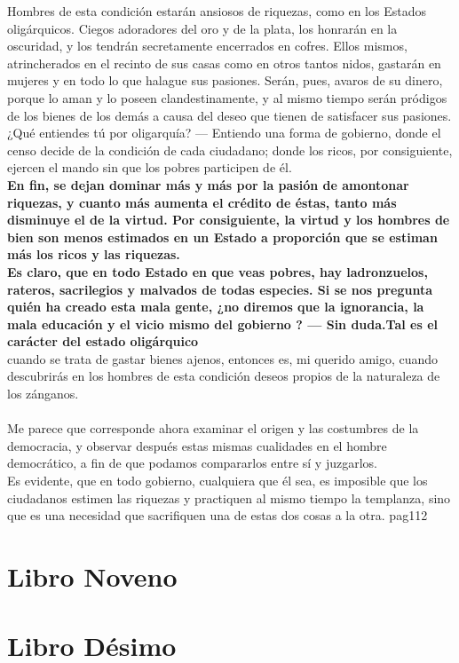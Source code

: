 \documentclass[10pt]{book}
\begin{document}
Hombres de esta condición  estarán  ansiosos de riquezas,  como en los Estados  oligárquicos.  Ciegos  adoradores  del  oro y  de la plata,  los honrarán  en  la  oscuridad,  y  los  tendrán  secretamente  encerrados  en  cofres.  Ellos mismos, atrincherados  en  el recinto  de sus casas como en otros  tantos nidos, gastarán  en  mujeres  y  en  todo lo  que  halague  sus pasiones. Serán,  pues, avaros  de  su  dinero,  porque  lo  aman  y  lo  poseen  clandestinamente,  y   al   mismo   tiempo  serán  pródigos  de  los bienes  de los demás a causa  del  deseo  que  tienen  de satisfacer  sus  pasiones.\\
¿Qué entiendes  tú por  oligarquía?  — Entiendo  una  forma  de gobierno,  donde  el censo decide  de la  condición  de  cada  ciudadano;  donde  los  ricos,  por  consiguiente, ejercen  el mando sin que los pobres  participen  de  él.  \\
\textbf{ En  fin,  se dejan  dominar  más  y más por la  pasión  de  amontonar riquezas,  y  cuanto  más  aumenta  el  crédito  de  éstas,  tanto  más  disminuye  el  de  la  virtud. Por  consiguiente, la virtud  y  los hombres de  bien son menos estimados  en  un  Estado  a  proporción  que  se estiman  más  los ricos  y  las riquezas.}\\
\textbf{Es claro,   que  en   todo  Estado  en  que  veas pobres, hay ladronzuelos,  rateros, sacrilegios y  malvados de todas especies.  Si se  nos pregunta  quién  ha  creado  esta  mala  gente,  ¿no diremos  que  la  ignorancia,  la  mala  educación  y  el vicio mismo del gobierno ? — Sin  duda.Tal es el carácter del estado oligárquico}\\
cuando se trata  de gastar  bienes  ajenos,  entonces  es, mi querido amigo,  cuando descubrirás en los hombres de esta  condición  deseos  propios de la naturaleza  de  los  zánganos. \\\\
Me parece  que  corresponde ahora  examinar el origen y  las costumbres  de  la   democracia,  y  observar  después  estas  mismas cualidades  en  el  hombre  democrático, a fin de que  podamos compararlos  entre  sí y juzgarlos.\\
Es  evidente,  que  en  todo gobierno, cualquiera que  él  sea,  es  imposible  que  los ciudadanos  estimen  las  riquezas  y  practiquen  al  mismo  tiempo  la  templanza,  sino  que  es  una  necesidad  que  sacrifiquen  una  de estas  dos  cosas a la otra.
pag112
\chapter*{Libro Noveno}

\chapter*{Libro Désimo}
 
\end{document}

